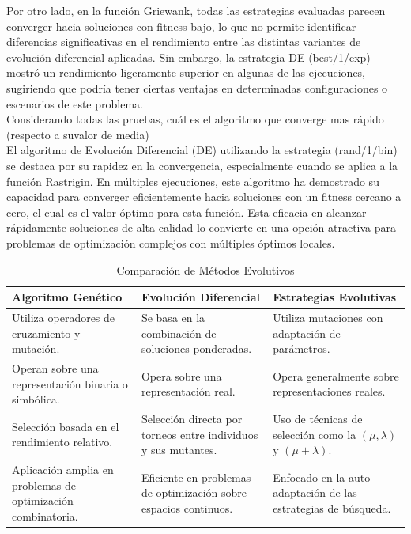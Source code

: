 \documentclass{report}
\begin{document}
Por otro lado, en la función Griewank, todas las estrategias evaluadas parecen converger hacia soluciones con fitness bajo, lo que no permite identificar diferencias significativas en el rendimiento entre las distintas variantes de evolución diferencial aplicadas. Sin embargo, la estrategia DE (best/1/exp) mostró un rendimiento ligeramente superior en algunas de las ejecuciones, sugiriendo que podría tener ciertas ventajas en determinadas configuraciones o escenarios de este problema.\\

Considerando todas las pruebas, cuál es el algoritmo que converge mas rápido (respecto a suvalor de media)\\
El algoritmo de Evolución Diferencial (DE) utilizando la estrategia (rand/1/bin) se destaca por su rapidez en la convergencia, especialmente cuando se aplica a la función Rastrigin. En múltiples ejecuciones, este algoritmo ha demostrado su capacidad para converger eficientemente hacia soluciones con un fitness cercano a cero, el cual es el valor óptimo para esta función. Esta eficacia en alcanzar rápidamente soluciones de alta calidad lo convierte en una opción atractiva para problemas de optimización complejos con múltiples óptimos locales.\\

\begin{table}[ht]
    \centering
    \caption{Comparación de Métodos Evolutivos}
    \label{tab:comparacion_metodos}
    \begin{tabularx}{\textwidth}{X|X|X}
    \toprule
    \textbf{Algoritmo Genético} & \textbf{Evolución Diferencial} & \textbf{Estrategias Evolutivas} \\
    \midrule
    Utiliza operadores de cruzamiento y mutación. & Se basa en la combinación de soluciones ponderadas. & Utiliza mutaciones con adaptación de parámetros. \\
    \addlinespace
    Operan sobre una representación binaria o simbólica. & Opera sobre una representación real. & Opera generalmente sobre representaciones reales. \\
    \addlinespace
    Selección basada en el rendimiento relativo. & Selección directa por torneos entre individuos y sus mutantes. & Uso de técnicas de selección como la $(\mu, \lambda)$ y $(\mu+\lambda)$. \\
    \addlinespace
    Aplicación amplia en problemas de optimización combinatoria. & Eficiente en problemas de optimización sobre espacios continuos. & Enfocado en la auto-adaptación de las estrategias de búsqueda. \\
    \bottomrule
    \end{tabularx}
\end{table}
\end{document}

